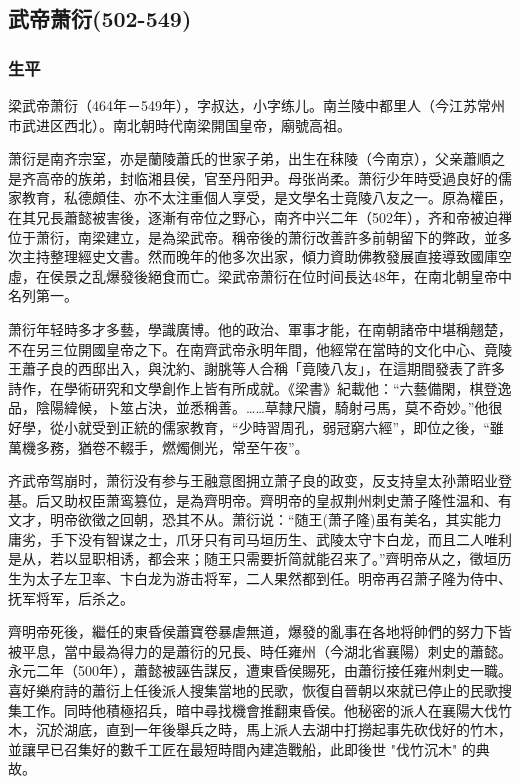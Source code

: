 
\subsection{武帝萧衍\tiny(502-549)}

\subsubsection{生平}

梁武帝萧衍（464年－549年），字叔达，小字练儿。南兰陵中都里人（今江苏常州市武进区西北）。南北朝時代南梁開国皇帝，廟號高祖。

萧衍是南齐宗室，亦是蘭陵蕭氏的世家子弟，出生在秣陵（今南京），父亲蕭順之是齐高帝的族弟，封临湘县侯，官至丹阳尹。母张尚柔。萧衍少年時受過良好的儒家教育，私德頗佳、亦不太注重個人享受，是文學名士竟陵八友之一。原為權臣，在其兄長蕭懿被害後，逐漸有帝位之野心，南齐中兴二年（502年），齐和帝被迫禅位于萧衍，南梁建立，是為梁武帝。稱帝後的萧衍改善許多前朝留下的弊政，並多次主持整理經史文書。然而晚年的他多次出家，傾力資助佛教發展直接導致國庫空虛，在侯景之乱爆發後絕食而亡。梁武帝萧衍在位时间長达48年，在南北朝皇帝中名列第一。

萧衍年轻時多才多藝，學識廣博。他的政治、軍事才能，在南朝諸帝中堪稱翹楚，不在另三位開國皇帝之下。在南齊武帝永明年間，他經常在當時的文化中心、竟陵王蕭子良的西邸出入，與沈約、謝脁等人合稱「竟陵八友」，在這期間發表了許多詩作，在學術研究和文學創作上皆有所成就。《梁書》紀載他：“六藝備閑，棋登逸品，陰陽緯候，卜筮占決，並悉稱善。……草隸尺牘，騎射弓馬，莫不奇妙。”他很好學，從小就受到正統的儒家教育，“少時習周孔，弱冠窮六經”，即位之後，“雖萬機多務，猶卷不輟手，燃燭側光，常至午夜”。

齐武帝驾崩时，萧衍没有参与王融意图拥立萧子良的政变，反支持皇太孙萧昭业登基。后又助权臣萧鸾篡位，是為齊明帝。齊明帝的皇叔荆州刺史萧子隆性温和、有文才，明帝欲徵之回朝，恐其不从。萧衍说：“随王(萧子隆)虽有美名，其实能力庸劣，手下没有智谋之士，爪牙只有司马垣历生、武陵太守卞白龙，而且二人唯利是从，若以显职相诱，都会来；随王只需要折简就能召来了。”齊明帝从之，徵垣历生为太子左卫率、卞白龙为游击将军，二人果然都到任。明帝再召萧子隆为侍中、抚军将军，后杀之。

齊明帝死後，繼任的東昏侯蕭寶卷暴虐無道，爆發的亂事在各地将帥們的努力下皆被平息，當中最為得力的是蕭衍的兄長、時任雍州（今湖北省襄陽）刺史的蕭懿。永元二年（500年），蕭懿被誣告謀反，遭東昏侯賜死，由蕭衍接任雍州刺史一職。喜好樂府詩的蕭衍上任後派人搜集當地的民歌，恢復自晉朝以來就已停止的民歌搜集工作。同時他積極招兵，暗中尋找機會推翻東昏侯。他秘密的派人在襄陽大伐竹木，沉於湖底，直到一年後舉兵之時，馬上派人去湖中打撈起事先砍伐好的竹木，並讓早已召集好的數千工匠在最短時間內建造戰船，此即後世 "伐竹沉木" 的典故。


